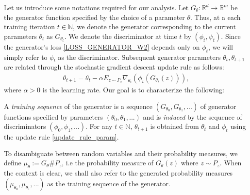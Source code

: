 \documentclass[runningheads]{llncs}
\begin{document}
Let us introduce some notations required for our analysis. 
Let $G_\theta:\mathds{R}^d\rightarrow \mathds{R}^m$ be the generator function specified by the choice of a parameter $\theta$. Thus, at a each training iteration $t\in \mathds{N}$, we denote the generator corresponding to the current parameters $\theta_t$ as $G_{\theta_t}$. We denote the discriminator at time $t$ by $(\phi_t,\psi_t)$. Since the generator's loss \eqref{LOSS_GENERATOR_W2} depends only on $\phi_t$, we will simply refer to $\phi_t$ as the discriminator.
Subsequent generator parameters $\theta_t, \theta_{t+1}$ are related through the stochastic gradient descent update rule as follows: %
\begin{align}
\theta_{t+1}= \theta_t- \alpha E_{z\sim P_z} \nabla_{\theta_t} (\phi_t(G_{\theta_t}(z))),
\label{update_rule_param}
\end{align}
where $\alpha>0$ is the learning rate. Our goal is to characterize the following:
\begin{definition}
\normalfont
A \textit{training sequence} of the generator is a sequence $(G_{\theta_0},G_{\theta_1},...)$ of generator functions specified by parameters $(\theta_0,\theta_1,...)$ and is \textit{induced} by the sequence of discriminators $(\phi_0, \phi_1,...)$. For any $t\in \mathds{N}$, $\theta_{t+1}$ is obtained from $\theta_t$ and $\phi_t$ using the update rule \eqref{update_rule_param}. 
\end{definition}
To disambiguate between random variables and their probability measures, we define $\mu_\theta:=G_\theta \# P_z$, i.e the probability measure of $G_\theta(z)$ where $z\sim P_z$. When the context is clear, we shall also refer to the generated probability measures $(\mu_{\theta_0},\mu_{\theta_1},...)$ as the training sequence of the generator.  
\end{document}
